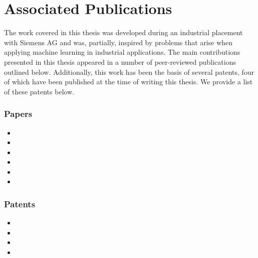 \section{Associated Publications}
The work covered in this thesis was developed during an industrial placement with Siemens AG and was, partially, inspired by problems that arise when applying machine learning in industrial applications.
The main contributions presented in this thesis appeared in a number of peer-reviewed publications outlined below.
Additionally, this work has been the basis of several patents, four of which have been published at the time of writing this thesis.
We provide a list of these patents below.

\subsubsection{Papers}
\begin{itemize}
    \item {}

    \item {}

    \item {}

    \item {}

    \item {}

    \item {}

\end{itemize}

\subsubsection{Patents}
\begin{itemize}
    \item {}
    \item {}
    \item {}
    \item {}
\end{itemize}
